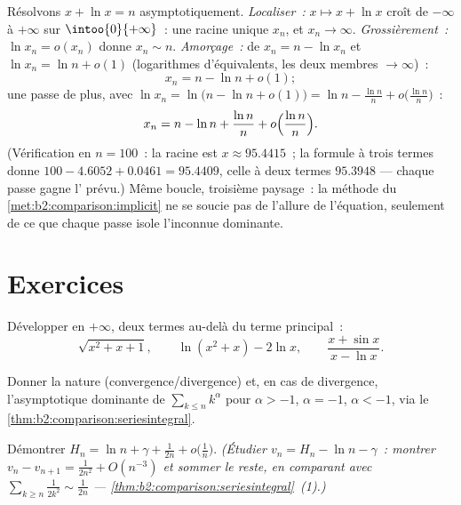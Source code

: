 \begin{example}\label{ex:b2:comparison:xplusln}
Résolvons $x + \ln x = n$ asymptotiquement. \emph{Localiser~:} $x
\mapsto x + \ln x$ croît de $-\infty$ à $+\infty$ sur
$\intoo{0}{+\infty}$~: une racine unique $x_n$, et $x_n \to \infty$.
\emph{Grossièrement~:} $\ln x_n = o(x_n)$ donne $x_n \sim n$.
\emph{Amorçage~:} de $x_n = n - \ln x_n$ et $\ln x_n = \ln n
+ o(1)$ (logarithmes d'équivalents, les deux membres $\to \infty$)~:
\[
x_n = n - \ln n + o(1) ;
\]
une passe de plus, avec $\ln x_n = \ln\bigl(n - \ln n + o(1)\bigr) =
\ln n - \frac{\ln n}{n} + o\bigl(\frac{\ln n}n\bigr)$~:
\[
x_n = n - \ln n + \frac{\ln n}{n} +
o\Bigl(\frac{\ln n}{n}\Bigr).
\]
(Vérification en $n = 100$~: la racine est $x \approx 95.4415$~; la
formule à trois termes donne $100 - 4.6052 + 0.0461 = 95.4409$, celle
à deux termes $95.3948$ --- chaque passe gagne l' prévu.) Même
boucle, troisième paysage~: la méthode du~%
\cref{met:b2:comparison:implicit} ne se soucie pas de l'allure de
l'équation, seulement de ce que chaque passe isole l'inconnue
dominante.
\end{example}

\section{Exercices}

\begin{exercise}[$\star$]\label{exo:b2:comparison:1}
Développer en $+\infty$, deux termes au-delà du terme principal~:
\[
\sqrt{x^2 + x + 1} ,
\qquad
\ln(x^2 + x) - 2\ln x,
\qquad
\frac{x + \sin x}{x - \ln x} .
\]
\end{exercise}

\begin{exercise}[$\star$]\label{exo:b2:comparison:2}
Donner la nature (convergence/divergence) et, en cas de divergence,
l'asymptotique dominante de $\sum_{k \leq n} k^\alpha$ pour $\alpha >
-1$, $\alpha = -1$, $\alpha < -1$, via le~%
\cref{thm:b2:comparison:seriesintegral}.
\end{exercise}

\begin{exercise}[$\star\star$]\label{exo:b2:comparison:3}
Démontrer $H_n = \ln n + \gamma + \frac{1}{2n} + o\bigl(\frac1n\bigr)$.
\emph{(Étudier $v_n = H_n - \ln n - \gamma$~: montrer $v_n - v_{n+1} =
\frac{1}{2n^2} + O(n^{-3})$ et sommer le reste, en comparant avec
$\sum_{k \geq n} \frac{1}{2k^2} \sim \frac{1}{2n}$ ---
\cref{thm:b2:comparison:seriesintegral}~(1).)}
\end{exercise}

